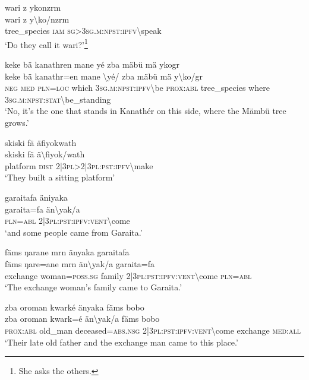 \ea\label{ex:14:a3174}
wari z ykonzrm\\
\gll wari	z	y{\textbackslash}ko/nzrm\\
     tree\_species	\textsc{iam}	\textsc{sg}>3\textsc{sg}.\textsc{m}:\textsc{npst}:\textsc{ipfv}{\textbackslash}speak\\
\glt `Do they call it wari?'\footnote{She asks the others.}
\z

\ea\label{ex:14:a3175}
keke bä kanathren mane yé zba mäbü mä ykogr\\
\gll keke	bä	kanathr=en	mane	{\textbackslash}yé/	zba	mäbü	mä	y{\textbackslash}ko/gr\\
     \textsc{neg}	\textsc{med}	\textsc{pln}=\textsc{loc}	which	3\textsc{sg}.\textsc{m}:\textsc{npst}:\textsc{ipfv}{\textbackslash}be	\textsc{prox}:\textsc{abl}	tree\_species	where	3\textsc{sg}.\textsc{m}:\textsc{npst}:\textsc{stat}{\textbackslash}be\_standing\\
\glt `No, it's the one that stands in Kanathér on this side, where the Mämbü tree grows.'
\z

\ea\label{ex:14:a3178}
skiski fä äfiyokwath\\
\gll skiski	fä	ä{\textbackslash}fiyok/wath\\
     platform	\textsc{dist}	2|3\textsc{pl}>2|3\textsc{pl}:\textsc{pst}:\textsc{ipfv}{\textbackslash}make\\
\glt `They built a sitting platform'
\z

\ea\label{ex:14:a3179}
garaitafa äniyaka\\
\gll garaita=fa	än{\textbackslash}yak/a\\
     \textsc{pln}=\textsc{abl}	2|3\textsc{pl}:\textsc{pst}:\textsc{ipfv}:\textsc{vent}{\textbackslash}come\\
\glt `and some people came from Garaita.'
\z

\ea\label{ex:14:a3180}
fäms ŋarane mrn änyaka garaitafa\\
\gll fäms	ŋare=ane	mrn	än{\textbackslash}yak/a	garaita=fa\\
     exchange	woman=\textsc{poss}.\textsc{sg}	family	2|3\textsc{pl}:\textsc{pst}:\textsc{ipfv}:\textsc{vent}{\textbackslash}come	\textsc{pln}=\textsc{abl}\\
\glt `The exchange woman's family came to Garaita.'
\z

\ea\label{ex:14:a3181}
zba oroman kwarké änyaka fäms bobo\\
\gll zba	oroman	kwark=é	än{\textbackslash}yak/a	fäms	bobo\\
     \textsc{prox}:\textsc{abl}	old\_man	deceased=\textsc{abs}.\textsc{nsg}	2|3\textsc{pl}:\textsc{pst}:\textsc{ipfv}:\textsc{vent}{\textbackslash}come	exchange	\textsc{med}:\textsc{all}\\
\glt `Their late old father and the exchange man came to this place.'
\z

